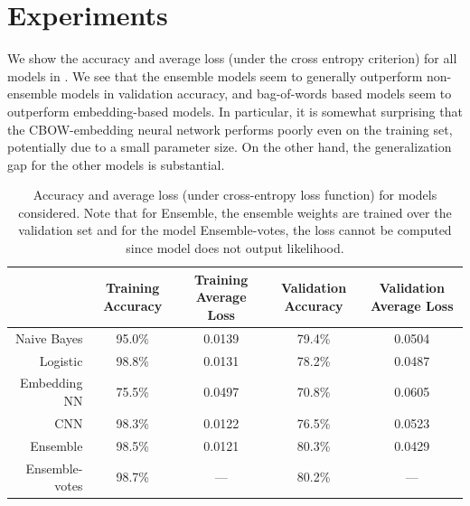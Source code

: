 \documentclass[11pt]{article}
\begin{document}
\section{Experiments}
\label{sec:experiment}
We show the accuracy and average loss (under the cross entropy criterion) for
all models in . We see that the ensemble models seem to
generally outperform non-ensemble models in validation accuracy, and
bag-of-words based models seem to outperform embedding-based models. In
particular, it is somewhat surprising that the CBOW-embedding neural network
performs poorly even on the training set, potentially due to a small parameter
size. On the other hand, the generalization gap for the other models is
substantial. 


\begin{landscape}
  \begin{table}[t]
\centering
\begin{tabular}{rcccc}
\toprule
{} & Training Accuracy &  Training Average Loss & Validation Accuracy &  Validation Average Loss \\
\midrule
Naive Bayes    &             95.0\% &                 0.0139 &               79.4\% &                   0.0504 \\
Logistic       &             98.8\% &                 0.0131 &               78.2\% &                   0.0487 \\
Embedding NN   &             75.5\% &                 0.0497 &               70.8\% &                   0.0605 \\
CNN            &             98.3\% &                 0.0122 &               76.5\% &                   0.0523 \\
Ensemble       &             98.5\% &                 0.0121 &               80.3\% &                   0.0429 \\
Ensemble-votes &             98.7\% &                    --- &               80.2\% &                      --- \\
\bottomrule
\end{tabular}
\caption{\label{tab:results} Accuracy and average loss (under cross-entropy loss
function) for models considered. Note that for Ensemble, the ensemble weights
are
trained over the validation set and for the model Ensemble-votes, the loss
cannot be computed since model does not output likelihood.}
\end{table}


\end{landscape}
\end{document}
